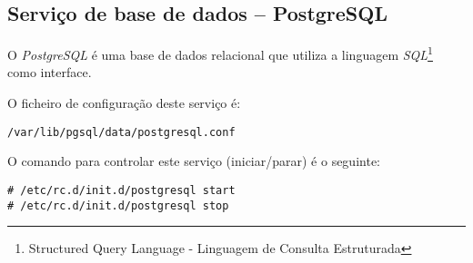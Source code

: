 \subsection{Serviço de base de dados -- PostgreSQL}

O \emph{PostgreSQL} é uma base de dados relacional que utiliza a linguagem
\emph{SQL}\footnote{Structured Query Language - Linguagem de Consulta Estruturada}
como interface.

O ficheiro de configuração deste serviço é:

\begin{Verbatim}[commandchars=\\\{\}]
/var/lib/pgsql/data/postgresql.conf
\end{Verbatim}

O comando para controlar este serviço (iniciar/parar) é o seguinte:

\begin{Verbatim}[commandchars=\\\{\}]
# /etc/rc.d/init.d/postgresql start
# /etc/rc.d/init.d/postgresql stop
\end{Verbatim}

